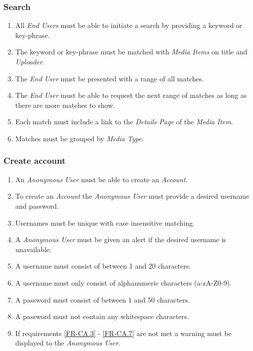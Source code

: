 \documentclass[../report.tex]{subfiles}
\begin{document}
\label{sec:Functional Requirements}


\subsubsection {Search}

\begin{enumerate}[label=\textbf{FR-\twodigits*}]

	\item All \textit{End Users} must be able to initiate a search by providing a keyword or key-phrase.
	\item The keyword or key-phrase must be matched with \textit{Media Items} on title and \textit{Uploader}.
	\item The \textit{End User} must be presented with a range of all matches.
	\item The \textit{End User} must be able to request the next range of matches as long as there are more matches to show.
	\item Each match must include a link to the \textit{Details Page} of the \textit{Media Item}.
	\item Matches must be grouped by \textit{Media Type}. 
\end{enumerate}	
			
\subsubsection{Create account}

\begin{enumerate}[label=\textbf{FR-\twodigits*}, resume]
	\item An \textit{Anonymous User} must be able to create an \textit{Account}.
	\item To create an \textit{Account} the \textit{Anonymous User} must provide a desired username and password.
	\item Usernames must be unique with case insensitive matching. \label{FR-CA.3}
	\item A \textit{Anonymous User} must be given an alert if the desired username is unavailable.
	\item A username must consist of between 1 and 20 characters.
	\item A username must only consist of alphanumeric characters (a-zA-Z0-9).
	\item A password must consist of between 1 and 50 characters. 
	\label{FR-CA.6}
	\item A password must not contain any whitespace characters. \label{FR-CA.7}
	\item If requirements \ref{FR-CA.3} - \ref{FR-CA.7} are not met a warning must be displayed to the \textit{Anonymous User}.
\end{enumerate}
	
\end{document}

